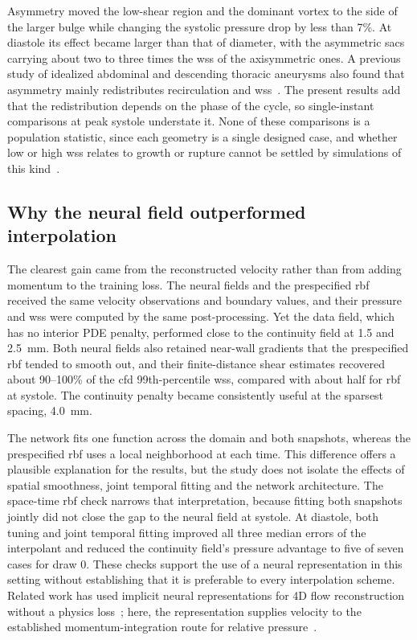 \documentclass[12pt,a4paper]{article}
\newcommand{\CFD}{\ac{cfd}\xspace}
\newcommand{\WSS}{\ac{wss}\xspace}
\newcommand{\RBF}{\ac{rbf}\xspace}
\theoremstyle{definition}
\numberwithin{equation}{section}
\begin{document}
Asymmetry moved the low-shear region and the dominant vortex to the side of the larger bulge while changing the systolic pressure drop by less than 7\%. At diastole its effect became larger than that of diameter, with the asymmetric sacs carrying about two to three times the \WSS of the axisymmetric ones. A previous study of idealized abdominal and descending thoracic aneurysms also found that asymmetry mainly redistributes recirculation and \WSS~\cite{rehman2024comparative}. The present results add that the redistribution depends on the phase of the cycle, so single-instant comparisons at peak systole understate it. None of these comparisons is a population statistic, since each geometry is a single designed case, and whether low or high \WSS relates to growth or rupture cannot be settled by simulations of this kind~\cite{geers2017wall,lipp2020computational}.

\subsection{Why the neural field outperformed interpolation}
The clearest gain came from the reconstructed velocity rather than from adding momentum to the training loss. The neural fields and the prespecified \RBF received the same velocity observations and boundary values, and their pressure and \WSS were computed by the same post-processing. Yet the data field, which has no interior PDE penalty, performed close to the continuity field at 1.5 and 2.5~mm. Both neural fields also retained near-wall gradients that the prespecified \RBF tended to smooth out, and their finite-distance shear estimates recovered about 90--100\% of the \CFD 99th-percentile \WSS, compared with about half for \RBF at systole. The continuity penalty became consistently useful at the sparsest spacing, 4.0~mm.

The network fits one function across the domain and both snapshots, whereas the prespecified \RBF uses a local neighborhood at each time. This difference offers a plausible explanation for the results, but the study does not isolate the effects of spatial smoothness, joint temporal fitting and the network architecture. The space-time \RBF check narrows that interpretation, because fitting both snapshots jointly did not close the gap to the neural field at systole. At diastole, both tuning and joint temporal fitting improved all three median errors of the interpolant and reduced the continuity field's pressure advantage to five of seven cases for draw 0. These checks support the use of a neural representation in this setting without establishing that it is preferable to every interpolation scheme. Related work has used implicit neural representations for 4D flow reconstruction without a physics loss~\cite{saitta2024implicit}; here, the representation supplies velocity to the established momentum-integration route for relative pressure~\cite{krittian2012finite,bertoglio2018relative}.
\end{document}
